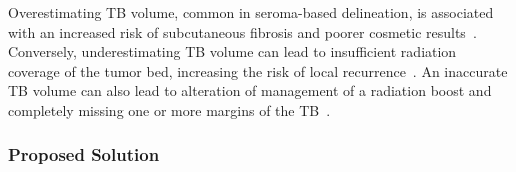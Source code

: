 Overestimating TB volume, common in seroma-based delineation, is associated with an increased risk of subcutaneous fibrosis and poorer cosmetic results~\cite{RefWorks:RefID:197-den2015postlumpectomy}. Conversely, underestimating TB volume can lead to insufficient radiation coverage of the tumor bed, increasing the risk of local recurrence~\cite{RefWorks:RefID:198-jiao2024interobserver}. An inaccurate TB volume can
also lead to alteration of management of a radiation boost and completely missing one or more margins of the TB~\cite{RefWorks:RefID:344-mitchell2019adaptable}.



\subsubsection{Proposed Solution\label{sec:introduction:motivation:proposedsolution}}
